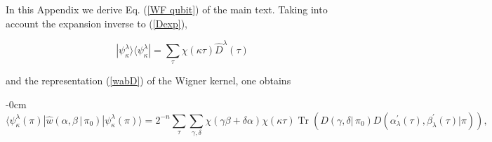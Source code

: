 \documentclass[quantumrep,article,submit,pdftex,moreauthors]{Definitions/mdpi}
\DeclareMathOperator{\Tr}{Tr}
\begin{document}
\vspace{6pt}


\authorcontributions{}




\appendixstart\appendix

\section[\appendixname~\thesection]{}
\label{appA}

In this Appendix we derive Eq. (\ref{WF qubit}) of the main text. Taking into
account the expansion inverse to (\ref{Dexp}),

\begin{equation}
  |\psi_{\kappa }^{\lambda}\rangle \langle \psi_{\kappa }^{\lambda}|
  = \sum_{\tau }\chi (\kappa \tau )\hat{D}^{\lambda }(\tau )
\end{equation}

and the representation (\ref{wabD}) of the Wigner kernel, one obtains

\begin{adjustwidth}{-\extralength}{0cm}
\begin{equation}
  \langle \psi_{\kappa}^{\lambda}(\pi)
  |\hat{w}\left(\alpha,\beta\,|\,\pi_{0}\right)
  |\psi_{\kappa}^{\lambda}(\pi)\rangle
  = 2^{-n} \sum_{\tau} \sum\limits_{\gamma,\delta}
  \chi\left( \gamma \beta + \delta \alpha \right)\chi(\kappa \tau)
  \Tr\left(
    D\left( \gamma, \delta |\,\pi_{0} \right)
    D\left(
      \alpha_{\lambda}^{\prime}(\tau),\beta_{\lambda}^{\prime }(\tau)|\pi
    \right)
  \right),
\end{equation}
\end{adjustwidth}
\end{document}
